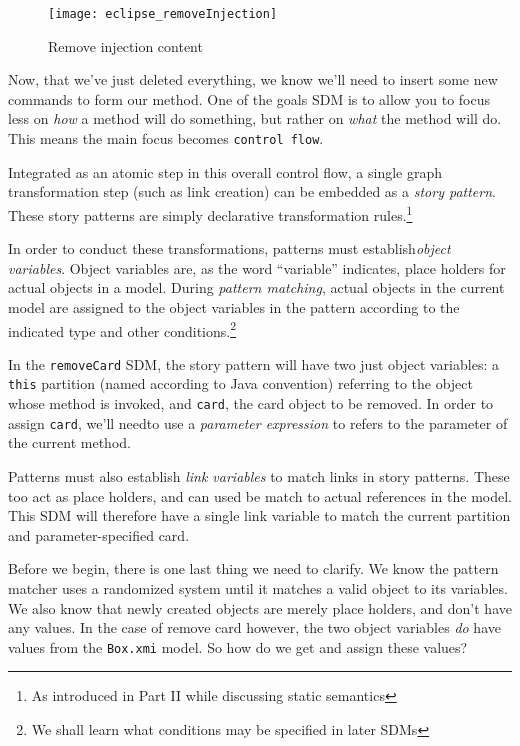 \newpage

\begin{figure}[htbp]
	\centering
    \texttt{[image: eclipse\_removeInjection]}
	\caption{Remove injection content}
	\label{fig:delete_injection}
\end{figure}

\vspace{0.5cm}

Now, that we've just deleted everything, we know we'll need to insert some new commands to form our method. One of the goals SDM is to allow you to
focus less on \emph{how} a method will do something, but rather on \emph{what} the method will do. This means the main focus becomes \texttt{control flow}.

Integrated as an atomic step in this overall control flow, a single graph transformation step (such as link creation) can be embedded as
a \emph{story pattern}. These story patterns are simply declarative transformation rules.\footnote{As introduced in Part II while
discussing static semantics}

In order to conduct these transformations, patterns must establish\emph{object variables}. Object variables are, as
the word ``variable'' indicates, place holders for actual objects in a model.  During \emph{pattern matching}, actual objects in the 
current model are assigned to the object variables in the pattern according to the indicated type and other conditions.\footnote{We shall
learn what conditions may be specified in later SDMs} 

In the \texttt{removeCard} SDM, the story pattern will have two just object variables: a \texttt{this} partition (named according to Java convention) referring
to the object whose method is invoked, and \texttt{card}, the card object to be removed. In order to assign \texttt{card}, we'll needto use a \emph{parameter expression} to refers to the parameter of the current method.

Patterns must also establish \emph{link variables} to match links in story patterns. These too act as place holders, and
can used be match to actual references in the model. This SDM will therefore have a single link variable to match the current partition and parameter-specified
card.

Before we begin, there is one last thing we need to clarify. We know the pattern matcher uses a randomized system until it matches a valid object to its
variables. We also know that newly created objects are merely place holders, and don't have any values. In the case of remove card however, the two object
variables \emph{do} have values from the \texttt{Box.xmi} model. So how do we get and assign these values?

